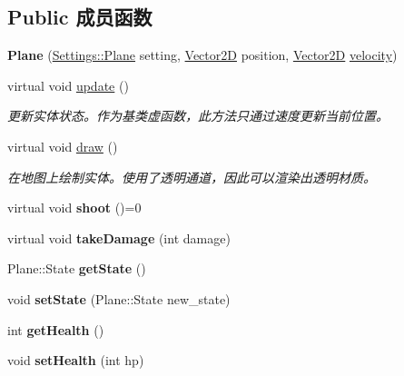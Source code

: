 \subsection*{Public 成员函数}
\begin{DoxyCompactItemize}
\item 
\mbox{\label{class_plane_ab0729538ddb380ca9a5b501f4cf72714}} 
{\bfseries Plane} (\hyperlink{struct_settings_1_1_plane}{Settings\+::\+Plane} setting, \hyperlink{structbasic__vector2_d}{Vector2D} position, \hyperlink{structbasic__vector2_d}{Vector2D} \hyperlink{class_entity_a386d25b56772b8913eb3e5adc636f6e0}{velocity})
\item 
virtual void \hyperlink{class_plane_a7fbb07f76503fe057772e01f542afc32}{update} ()
\begin{DoxyCompactList}\small\item\em 更新实体状态。作为基类虚函数，此方法只通过速度更新当前位置。 \end{DoxyCompactList}\item 
virtual void \hyperlink{class_plane_a8877358878e91929c4c01bad40cbdb78}{draw} ()
\begin{DoxyCompactList}\small\item\em 在地图上绘制实体。使用了透明通道，因此可以渲染出透明材质。 \end{DoxyCompactList}\item 
\mbox{\label{class_plane_af999499b5e79309d94004e8d012fe9c4}} 
virtual void {\bfseries shoot} ()=0
\item 
\mbox{\label{class_plane_a1a93dbb00292aaae274c152079f5f6f3}} 
virtual void {\bfseries take\+Damage} (int damage)
\item 
\mbox{\label{class_plane_a3cc5e05c7152c39449d36a1bf89f3e92}} 
Plane\+::\+State {\bfseries get\+State} ()
\item 
\mbox{\label{class_plane_a71aa431d9b6b1ab4b187ab1a24f441ff}} 
void {\bfseries set\+State} (Plane\+::\+State new\+\_\+state)
\item 
\mbox{\label{class_plane_ad63d1e65ff9ca0d8b0ea1f6d37c55388}} 
int {\bfseries get\+Health} ()
\item 
\mbox{\label{class_plane_a139404454150aac00b0f94b7f7d0d68e}} 
void {\bfseries set\+Health} (int hp)
\end{DoxyCompactItemize}
